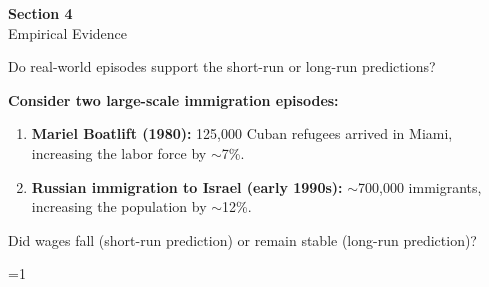 \documentclass{beamer}
\newcommand{\showanswers}{1}  %
\begin{document}
\begin{frame}

\vspace{2cm}

\centering
{\LARGE \textbf{Section 4}} \\[0.5cm]
{\Large Empirical Evidence}

\vfill

\end{frame}



\begin{frame}{Do real-world episodes support the short-run or long-run predictions?}

\textbf{Consider two large-scale immigration episodes:}

\vspace{0.3cm}

\begin{enumerate}
    \item \textbf{Mariel Boatlift (1980):} 125,000 Cuban refugees arrived in Miami, increasing the labor force by $\sim$7\%.

    \vspace{0.2cm}

    \item \textbf{Russian immigration to Israel (early 1990s):} $\sim$700,000 immigrants, increasing the population by $\sim$12\%.
\end{enumerate}

\vspace{0.3cm}

Did wages fall (short-run prediction) or remain stable (long-run prediction)?

\end{frame}



\ifnum\showanswers=1
\end{document}
